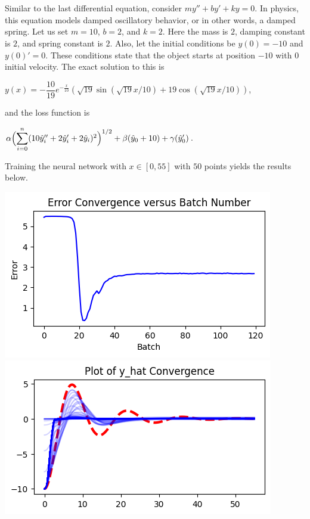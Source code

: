 \documentclass[12pt]{article}
\newcommand{\dsum}[2]{\mathlarger{\sum}_{#1}^{#2}}
\newcommand{\bgc}{\begin{center}}
\newcommand{\enc}{\end{center}}
\begin{document}
\begin{description}
\begin{minipage}{\linewidth}
    \end{minipage}
    \hfill \\
    \hline
    \hfill \\
    Similar to the last differential equation, consider $my'' + by' + ky = 0$.
    In physics, this equation models damped oscillatory behavior, or in other
    words, a damped spring. Let us set $m = 10$, $b = 2$, and $k = 2$. Here the
    mass is $2$, damping constant is $2$, and spring constant is $2$.  Also,
    let the initial conditions be $y(0) = -10$ and $y(0)' = 0$. These
    conditions state that the object starts at position $-10$ with $0$ initial
    velocity. The exact solution to this is 
    \bgc 
    $y(x) = -\dfrac{10}{19} e^{-\frac{x}{10}} (\sqrt{19}\sin(\sqrt{19}x/10) + 19\cos(\sqrt{19}x/10))$,
    \enc
    and the loss function is 
    \bgc 
    $\alpha\Bigl(\dsum{i=0}{n}(10\hat{y}_i'' + 2\hat{y}_i' + 2\hat{y}_i)^2\Bigr)^{1/2} 
    + \beta(\hat{y}_0 + 10)
    + \gamma(\hat{y}_0')$.
    \enc
    Training the neural network with $x\in[0, 55]$ with $50$ points yields the
    results below. \\ 
    \begin{minipage}{\linewidth}
        \centering
        \includegraphics[scale=.5]{images/figure13.png}
        \includegraphics[scale=.5]{images/figure14.png}

\end{minipage}
\end{description}
\end{document}
